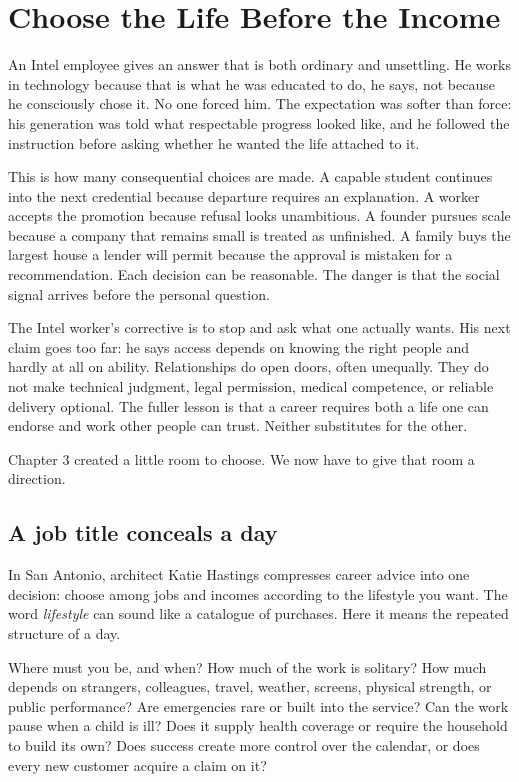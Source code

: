 \chapter{Choose the Life Before the Income}

An Intel employee gives an answer that is both ordinary and unsettling. He
works in technology because that is what he was educated to do, he says, not
because he consciously chose it. No one forced him. The expectation was softer
than force: his generation was told what respectable progress looked like, and
he followed the instruction before asking whether he wanted the life attached
to it.

This is how many consequential choices are made. A capable student continues
into the next credential because departure requires an explanation. A worker
accepts the promotion because refusal looks unambitious. A founder pursues
scale because a company that remains small is treated as unfinished. A family
buys the largest house a lender will permit because the approval is mistaken
for a recommendation. Each decision can be reasonable. The danger is that the
social signal arrives before the personal question.

The Intel worker's corrective is to stop and ask what one actually wants. His
next claim goes too far: he says access depends on knowing the right people and
hardly at all on ability. Relationships do open doors, often unequally. They do
not make technical judgment, legal permission, medical competence, or reliable
delivery optional. The fuller lesson is that a career requires both a life one
can endorse and work other people can trust. Neither substitutes for the other.

Chapter 3 created a little room to choose. We now have to give that room a
direction.

\section{A job title conceals a day}

In San Antonio, architect Katie Hastings compresses career advice into one
decision: choose among jobs and incomes according to the lifestyle you want.
The word \emph{lifestyle} can sound like a catalogue of purchases. Here it
means the repeated structure of a day.

Where must you be, and when? How much of the work is solitary? How much depends
on strangers, colleagues, travel, weather, screens, physical strength, or
public performance? Are emergencies rare or built into the service? Can the
work pause when a child is ill? Does it supply health coverage or require the
household to build its own? Does success create more control over the calendar,
or does every new customer acquire a claim on it?

